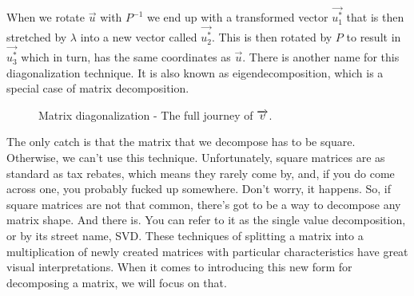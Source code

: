 \documentclass[600paper, 11pt,twoside,openany]{kdp}
\begin{document}
\indent 
When we rotate $\overrightarrow{u}$ with $P^{-1}$ we end up with a transformed vector $\overrightarrow{u_1^*}$ that is then  stretched by $\lambda$ into a new vector called $\overrightarrow{u_2^*}$. This is then rotated by $P$ to result in $\overrightarrow{u_3^*}$ which in turn, has the same coordinates as $\overrightarrow{u}$. There is another name for this diagonalization technique. It is also known as eigendecomposition, which is a special case of matrix decomposition.

\begin{figure}[h!]
\begin{center}
\end{center}
\caption{Matrix diagonalization - The full journey of $\protect\overrightarrow{v}$.}
\end{figure}

\indent 
The only catch is that the matrix that we decompose has to be square. Otherwise, we can’t use this technique.  Unfortunately, square matrices are as standard as tax rebates, which means they rarely come by, and, if you do come across one, you probably fucked up somewhere. Don’t worry, it happens. So, if square matrices are not that common, there’s got to be a way to decompose any matrix shape. And there is. You can refer to it as the single value decomposition, or by its street name, SVD. These techniques of splitting a matrix into a multiplication of newly created matrices with particular characteristics have great visual interpretations. When it comes to introducing this new form for decomposing a matrix, we will focus on that.
\end{document}
